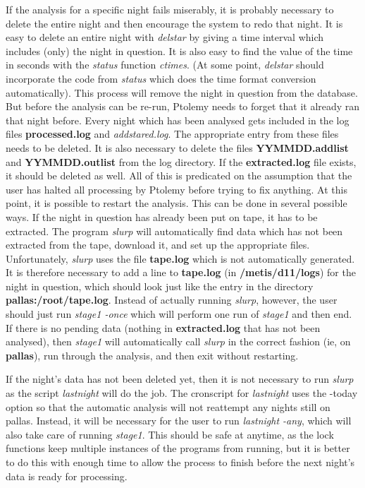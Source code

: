 \documentclass{article}
\newcommand\pr{\em}                   %
\newcommand\ff{\bf}                   %
\begin{document}
If the analysis for a specific night fails miserably, it is probably
necessary to delete the entire night and then encourage the system to
redo that night.  It is easy to delete an entire night with {\pr
delstar} by giving a time interval which includes (only) the night in
question.  It is also easy to find the value of the time in seconds
with the {\pr status} function {\pr ctimes}.  (At some point, {\pr
delstar} should incorporate the code from {\pr status} which does the
time format conversion automatically).  This process will remove the
night in question from the database.  But before the analysis can be
re-run, Ptolemy needs to forget that it already ran that night before.
Every night which has been analysed gets included in the log files
{\ff processed.log} and {\pr addstared.log}.  The appropriate entry
from these files needs to be deleted.  It is also necessary to delete
the files {\ff YYMMDD.addlist} and {\ff YYMMDD.outlist} from the log
directory.  If the {\ff extracted.log} file exists, it should be
deleted as well.  All of this is predicated on the assumption that the
user has halted all processing by Ptolemy before trying to fix
anything.  At this point, it is possible to restart the analysis.
This can be done in several possible ways.  If the night in question
has already been put on tape, it has to be extracted.  The program
{\pr slurp} will automatically find data which has not been extracted
from the tape, download it, and set up the appropriate files.
Unfortunately, {\pr slurp} uses the file {\ff tape.log} which is not
automatically generated.  It is therefore necessary to add a line to
{\ff tape.log} (in {\ff /metis/d11/logs}) for the night in question,
which should look just like the entry in the directory {\ff
pallas:/root/tape.log}.  Instead of actually running {\pr slurp},
however, the user should just run {\pr stage1 -once} which will
perform one run of {\pr stage1} and then end.  If there is no pending
data (nothing in {\ff extracted.log} that has not been analysed), then
{\pr stage1} will automatically call {\pr slurp} in the correct
fashion (ie, on {\ff pallas}), run through the analysis, and then exit
without restarting.

If the night's data has not been deleted yet, then it is not necessary
to run {\pr slurp} as the script {\pr lastnight} will do the job.  The
cronscript for {\pr lastnight} uses the -today option so that the
automatic analysis will not reattempt any nights still on pallas.
Instead, it will be necessary for the user to run {\pr lastnight
-any}, which will also take care of running {\pr stage1}. This should be
safe at anytime, as the lock functions keep multiple instances of the
programs from running, but it is better to do this with enough time to
allow the process to finish before the next night's data is ready for
processing.
\end{document}

